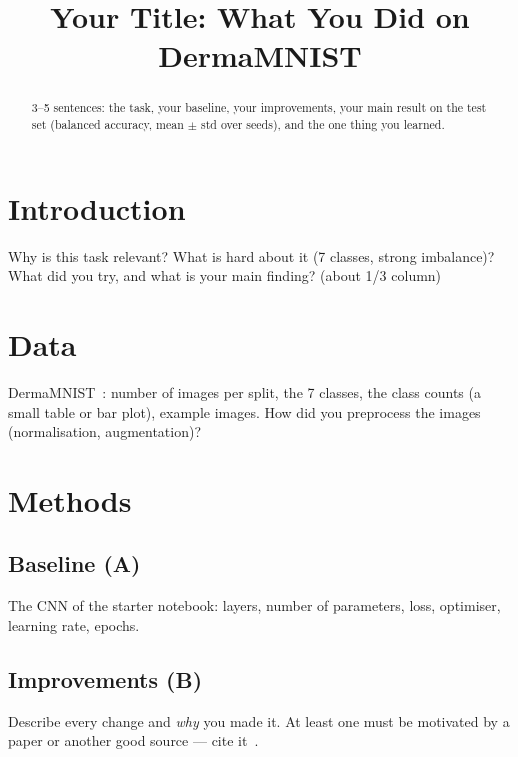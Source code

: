 \documentclass[conference]{IEEEtran}
\begin{document}
\title{Your Title: What You Did on DermaMNIST}

\author{
\and
{}
}

\maketitle

\begin{abstract}
3--5 sentences: the task, your baseline, your improvements, your main result on the test set
(balanced accuracy, mean $\pm$ std over seeds), and the one thing you learned.
\end{abstract}

\section{Introduction}
Why is this task relevant? What is hard about it (7 classes, strong imbalance)?
What did you try, and what is your main finding? (about 1/3 column)

\section{Data}
DermaMNIST~\cite{medmnistv2}: number of images per split, the 7 classes, the class counts (a small table or
bar plot), example images. How did you preprocess the images (normalisation, augmentation)?

\section{Methods}
\subsection{Baseline (A)}
The CNN of the starter notebook: layers, number of parameters, loss, optimiser, learning rate, epochs.

\subsection{Improvements (B)}
Describe every change and \emph{why} you made it. At least one must be motivated by a paper or another good
source --- cite it~\cite{he2016resnet}.
\end{document}
